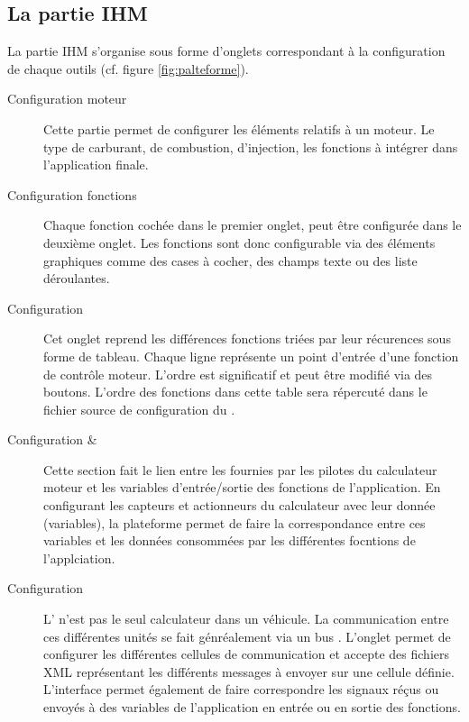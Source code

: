 \subsection{La partie IHM}
La partie IHM s'organise sous forme d'onglets correspondant à la configuration de chaque outils (cf. figure \ref{fig:palteforme}). 
\begin{description}
  \item[Configuration moteur] Cette partie permet de configurer les éléments relatifs à un moteur. Le type de carburant, de combustion, d'injection, les fonctions à intégrer dans l'application finale.
  \item[Configuration fonctions] Chaque fonction cochée dans le premier onglet, peut être configurée dans le deuxième onglet. Les fonctions sont donc configurable via des éléments graphiques comme des cases à cocher, des champs texte ou des liste déroulantes.
  \item[Configuration ] Cet onglet reprend les différences fonctions triées par leur récurences sous forme de tableau. Chaque ligne représente un point d'entrée d'une fonction de contrôle moteur. L'ordre est significatif et peut être modifié via des boutons. L'ordre des fonctions dans cette table sera répercuté dans le fichier source de configuration du .
  \item[Configuration  \& ] Cette section fait le lien entre les  fournies par les pilotes du calculateur moteur et les variables d'entrée/sortie des fonctions de l'application. En configurant les capteurs et actionneurs du calculateur avec leur donnée (variables), la plateforme permet de faire la correspondance entre ces variables et les données consommées par les différentes focntions de l'applciation.
  \item[Configuration ] L' n'est pas le seul calculateur dans un véhicule. La communication entre ces différentes unités se fait génréalement via un bus . L'onglet  permet de configurer les différentes cellules de communication et accepte des fichiers XML représentant les différents messages à envoyer sur une cellule définie. L'interface permet également de faire correspondre les signaux réçus ou envoyés à des variables de l'application en entrée ou en sortie des fonctions.
\end{description}

